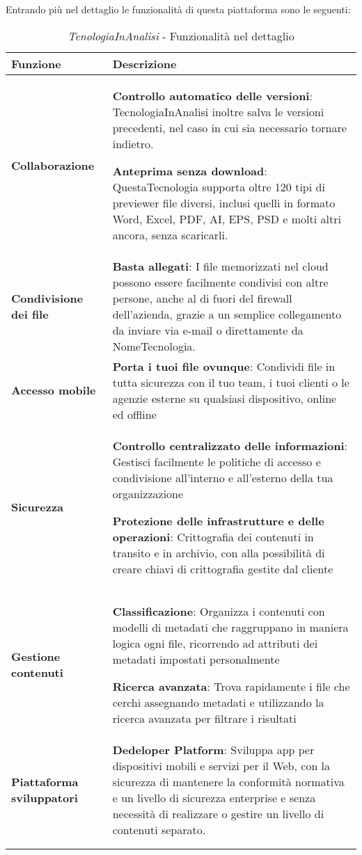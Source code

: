 \noindent Entrando più nel dettaglio le funzionalità di questa piattaforma sono le seguenti:
\begin{longtable}[c] { >{\centering\arraybackslash}p{3cm} >{\arraybackslash}p{10cm}}
		\toprule
		\centerline{\textbf{Funzione}}  & \centerline{\textbf{Descrizione}} \\
			\midrule
			\textbf{Collaborazione} & \textbf{Controllo automatico delle versioni}: TecnologiaInAnalisi inoltre salva le versioni precedenti, nel caso in cui sia necessario tornare indietro.
			\vspace*{5mm}

			\textbf{Anteprima senza download}: QuestaTecnologia supporta oltre 120 tipi di previewer file diversi, inclusi quelli in formato Word, Excel, PDF, AI, EPS, PSD e molti altri ancora, senza scaricarli. \\
			\addlinespace[0.3em]
			\midrule
			\addlinespace[0.3em]
			\textbf{Condivisione dei file} & \textbf{Basta allegati}: I file memorizzati nel cloud possono essere facilmente condivisi con altre persone, anche al di fuori del firewall dell'azienda, grazie a un semplice collegamento da inviare via e-mail o direttamente da NomeTecnologia. \\
			\addlinespace[0.3em]
			\midrule
			\addlinespace[0.3em]
			\textbf{Accesso mobile} & \textbf{Porta i tuoi file ovunque}: Condividi file in tutta sicurezza con il tuo team, i tuoi clienti o le agenzie esterne su qualsiasi dispositivo, online ed offline \\
			\addlinespace[0.3em]
			\midrule
			\addlinespace[0.3em]
			\textbf{Sicurezza} & \textbf{Controllo centralizzato delle informazioni}: Gestisci facilmente le politiche di accesso e condivisione all'interno e all'esterno della tua organizzazione
			\vspace*{5mm}

			\textbf{Protezione delle infrastrutture e delle operazioni}: Crittografia dei contenuti in transito e in archivio, con alla possibilità di creare chiavi di crittografia gestite dal cliente \\
			\addlinespace[0.3em]
			\midrule
			\addlinespace[0.3em]
			\textbf{Gestione contenuti} & \textbf{Classificazione}: Organizza i contenuti con modelli di metadati che raggruppano in maniera logica ogni file, ricorrendo ad attributi dei metadati impostati personalmente
			\vspace*{5mm}

			\textbf{Ricerca avanzata}: Trova rapidamente i file che cerchi assegnando metadati e utilizzando la ricerca avanzata per filtrare i risultati \\
			\addlinespace[0.3em]
			\midrule
			\addlinespace[0.3em]
			\textbf{Piattaforma sviluppatori} & \textbf{Dedeloper Platform}: Sviluppa app per dispositivi mobili e servizi per il Web, con la sicurezza di mantenere la conformità normativa e un livello di sicurezza enterprise e senza necessità di realizzare o gestire un livello di contenuti separato. \\
			\bottomrule\\
			\caption{\emph{TenologiaInAnalisi} - Funzionalità nel dettaglio}
			\label{tab:box_features}
\end{longtable}